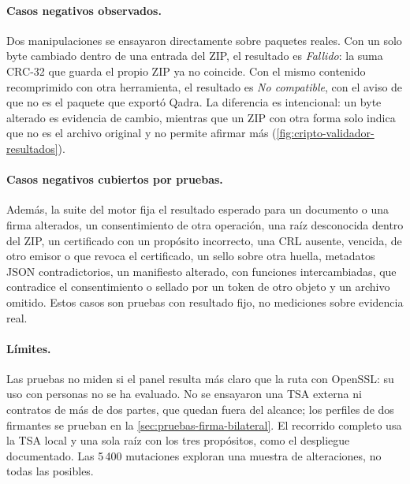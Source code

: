 \paragraph{Casos negativos observados.} Dos manipulaciones se ensayaron directamente sobre paquetes reales. Con un solo byte cambiado dentro de una entrada del ZIP, el resultado es \emph{Fallido}: la suma CRC-32 que guarda el propio ZIP ya no coincide. Con el mismo contenido recomprimido con otra herramienta, el resultado es \emph{No compatible}, con el aviso de que no es el paquete que exportó Qadra. La diferencia es intencional: un byte alterado es evidencia de cambio, mientras que un ZIP con otra forma solo indica que no es el archivo original y no permite afirmar más (\cref{fig:cripto-validador-resultados}).

\paragraph{Casos negativos cubiertos por pruebas.} Además, la suite del motor fija el resultado esperado para un documento o una firma alterados, un consentimiento de otra operación, una raíz desconocida dentro del ZIP, un certificado con un propósito incorrecto, una CRL ausente, vencida, de otro emisor o que revoca el certificado, un sello sobre otra huella, metadatos JSON contradictorios, un manifiesto alterado, con funciones intercambiadas, que contradice el consentimiento o sellado por un token de otro objeto y un archivo omitido. Estos casos son pruebas con resultado fijo, no mediciones sobre evidencia real.

\paragraph{Límites.} Las pruebas no miden si el panel resulta más claro que la ruta con OpenSSL: su uso con personas no se ha evaluado. No se ensayaron una TSA externa ni contratos de más de dos partes, que quedan fuera del alcance; los perfiles de dos firmantes se prueban en la \cref{sec:pruebas-firma-bilateral}. El recorrido completo usa la TSA local y una sola raíz con los tres propósitos, como el despliegue documentado. Las 5\,400 mutaciones exploran una muestra de alteraciones, no todas las posibles.

